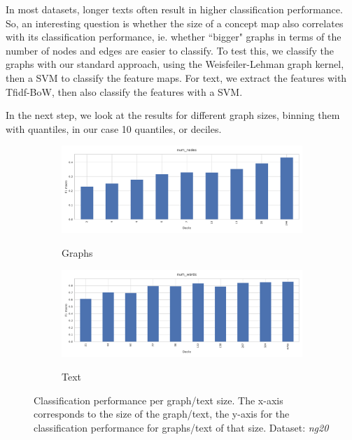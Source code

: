 In most datasets, longer texts often result in higher classification performance.
So, an interesting question is whether the size of a concept map also correlates with its classification performance, ie. whether ``bigger" graphs in terms of the number of nodes and edges are easier to classify.
To test this, we classify the graphs with our standard approach, using the Weisfeiler-Lehman graph kernel, then a SVM to classify the feature maps.
For text, we extract the features with Tfidf-BoW, then also classify the features with a SVM.

\iffalse
In the next step, we look at the results for different graph sizes, binning them with quantiles, in our case 10 quantiles, or deciles.

\begin{figure}[htb!]
    \begin{subfigure}[t]{.5\linewidth}  {\includegraphics[width=\linewidth]{assets/figures/graph_binning_num_nodes.pdf}\label{fig:todo_1}}
    \caption{Graphs}
    \end{subfigure}
    \hfill
        \begin{subfigure}[t]{.5\linewidth}
    {\includegraphics[width=\linewidth]{assets/figures/text_binning_num_words.pdf}\label{fig:todo_2}}
    \caption{Text}
    \end{subfigure}
    \caption[Statistics: Histogram of classification performance per graph/text size]{Classification performance per graph/text size. The x-axis corresponds to the size of the graph/text, the y-axis for the classification performance for graphs/text of that size. Dataset: \textit{ng20}}\label{fig:graph_size_performance}
\end{figure}


